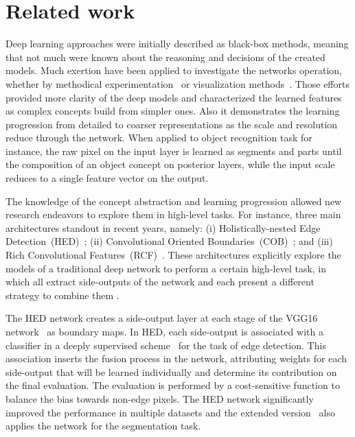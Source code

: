 \section{Related work}
\label{sec:related}




Deep learning approaches were initially described as black-box methods, meaning that not much were known about the reasoning and decisions of the created models. Much exertion have been applied to investigate the networks operation, whether by methodical experimentation~\cite{ilin17,kuo16,eigen14,zhang17} or visualization methods~\cite{simonyan13,zeiler14}. Those efforts provided more clarity of the deep models and characterized the learned features as complex concepts build from simpler ones. Also it demonstrates the learning progression from detailed to coarser representations as the scale and resolution reduce through the network.  When applied to object recognition task for instance, the raw pixel on the input layer is learned as segments and parts until the composition of an object concept on posterior layers, while the input scale reduces to a single feature vector on the output.  

The knowledge of the concept abstraction and learning progression allowed new research endeavors to explore  them in high-level tasks. For instance, three main architectures standout in recent years, namely: (i) Holistically-nested Edge Detection~(HED)~\cite{xie2015}; (ii) Convolutional Oriented Boundaries~(COB)~\cite{maninis2017}; and (iii) Rich Convolutional Features~(RCF)~\cite{liu2017}. These architectures explicitly explore the models of a traditional deep network to perform a certain high-level task, in which all extract side-outputs of the network and each present a different strategy to combine them . 

The HED network creates a side-output layer at each stage of the VGG16 network~\cite{simonyan2014} as boundary maps. In HED, each side-output is associated with a classifier in a deeply supervised scheme~\cite{lee2015} for the task of edge detection. This association inserts the fusion process in the network, attributing weights for each side-output that will be learned individually and determine its contribution on the final evaluation. The evaluation is performed by a cost-sensitive function to balance the bias towards non-edge pixels. The HED network significantly improved the performance in multiple datasets and the extended version~\cite{xie2017} also applies the network for the segmentation task. 

